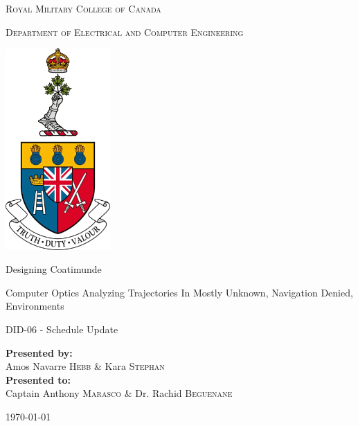 \documentclass{article}
\begin{document}
	
\begin{titlepage}
	\begin{center}
		\vspace*{1cm}
		
		\LARGE\textsc{Royal Military College of Canada}\normalsize
		
		\vspace{0.2cm}
		
		\textsc{Department of Electrical and Computer Engineering}
		
		\vspace{1.5cm}
		
		\includegraphics[width=0.3\textwidth]{rmcLogo.png}
		
		\vspace{1.5cm}
		
		\LARGE{Designing Coatimunde\\}
		
		\vspace{0.2cm}
		
		\normalsize{Computer Optics Analyzing Trajectories In Mostly Unknown, Navigation Denied, Environments}
		
		\vspace{0.1cm}
		
		\normalsize{DID-06 - Schedule Update}
		
		\vfill
		
		\textbf{Presented by:}\\Amos Navarre \textsc{Hebb} \& Kara \textsc{Stephan}\\
		\vspace{0.8cm}
		\textbf{Presented to:}\\Captain Anthony \textsc{Marasco} \& Dr. Rachid \textsc{Beguenane}
		\vspace{0.8cm}
		
		\today
		
	\end{center}
\end{titlepage}
\end{document}
